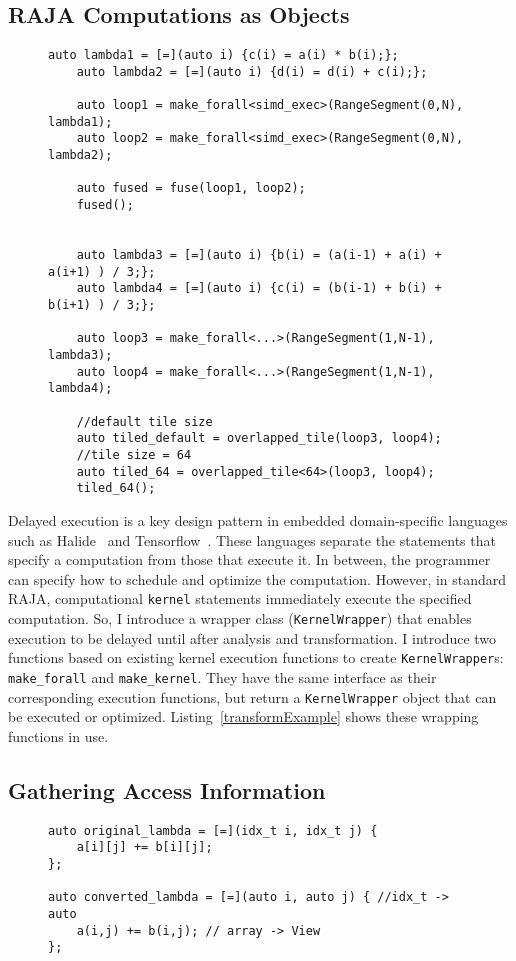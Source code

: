 \subsection{RAJA Computations as Objects}
\begin{figure}[t]
	\begin{lstlisting}[caption={Using the \texttt{fuse} and \texttt{overlapped\_tile} transformations.}, label={transformExample}]
	auto lambda1 = [=](auto i) {c(i) = a(i) * b(i);};
	auto lambda2 = [=](auto i) {d(i) = d(i) + c(i);};
	
	auto loop1 = make_forall<simd_exec>(RangeSegment(0,N), lambda1);
	auto loop2 = make_forall<simd_exec>(RangeSegment(0,N), lambda2);
	
	auto fused = fuse(loop1, loop2);
	fused();
	
	
	auto lambda3 = [=](auto i) {b(i) = (a(i-1) + a(i) + a(i+1) ) / 3;};
	auto lambda4 = [=](auto i) {c(i) = (b(i-1) + b(i) + b(i+1) ) / 3;};
	
	auto loop3 = make_forall<...>(RangeSegment(1,N-1), lambda3);
	auto loop4 = make_forall<...>(RangeSegment(1,N-1), lambda4);
	
	//default tile size
	auto tiled_default = overlapped_tile(loop3, loop4);
	//tile size = 64
	auto tiled_64 = overlapped_tile<64>(loop3, loop4);
	tiled_64();
	 \end{lstlisting}
	\end{figure}
Delayed execution is a key design pattern in %
embedded domain-specific languages such as
Halide~\cite{ragan-kelley2013halide} and Tensorflow~\cite{tensorflow}.
These languages separate the statements that specify a computation from
those that execute it.
In between, the programmer can specify how to schedule and optimize the computation.
However, in standard RAJA, computational \verb.kernel. statements immediately execute the specified computation.
So, I introduce a wrapper class (\verb.KernelWrapper.) that enables execution
to be delayed until after analysis and transformation.
I introduce two functions based on existing kernel execution functions to
create \verb.KernelWrapper.s: \verb.make_forall. and \verb.make_kernel..
They have the same interface as their corresponding execution functions, but
return a \verb.KernelWrapper. object that can be executed or optimized.
Listing~\ref{transformExample} shows these wrapping functions in use. 


\subsection{Gathering Access Information}\label{subsec:accesses}
\begin{figure}[t]
\begin{lstlisting}[label={symExecChanges}, caption={Kernel Lambda Conversion}]
auto original_lambda = [=](idx_t i, idx_t j) {
	a[i][j] += b[i][j];
};

auto converted_lambda = [=](auto i, auto j) { //idx_t -> auto
	a(i,j) += b(i,j); // array -> View
};
\end{lstlisting}
\end{figure}

